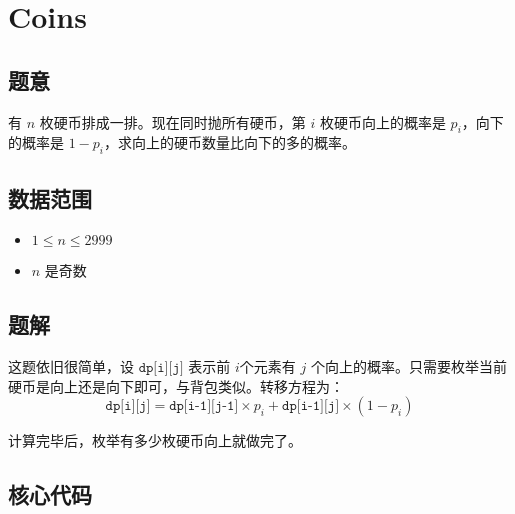 \section{Coins}
\subsection*{题意}
有 $n$ 枚硬币排成一排。现在同时抛所有硬币，第 $i$ 枚硬币向上的概率是 $p_i$，向下的概率是 $1-p_i$，求向上的硬币数量比向下的多的概率。
\subsection*{数据范围}
\begin{itemize}
\item $1 \leq n \leq 2999$
\item $n$ 是奇数
\end{itemize}
\subsection*{题解}
这题依旧很简单，设 ${\texttt{dp[i][j]}}$ 表示前 $i$个元素有 $j$ 个向上的概率。只需要枚举当前硬币是向上还是向下即可，与背包类似。转移方程为：
$$
{\texttt{dp[i][j]}} = {\texttt{dp[i-1][j-1]}}\times p_i + {\texttt{dp[i-1][j]}}\times (1-p_i)
$$

计算完毕后，枚举有多少枚硬币向上就做完了。


\subsection*{核心代码}
\inputminted[linenos,autogobble]{cpp}{../Code/I.cpp}
\newpage